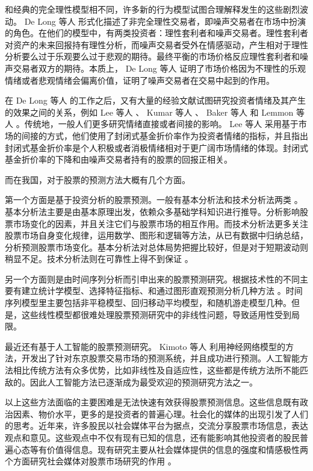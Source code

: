 和经典的完全理性模型相不同，许多新的行为模型试图合理解释发生的这些剧烈波动。 De Long 等人 \cite{intro:5} 形式化描述了非完全理性交易者，即噪声交易者在市场中扮演的角色。在他们的模型中，有两类投资者：理性套利者和噪声交易者。理性套利者对资产的未来回报持有理性分析，而噪声交易者受外在情感驱动，产生相对于理性分析要么过于乐观要么过于悲观的期待。最终平衡的市场价格反应理性套利者和噪声交易者双方的期待。本质上， De Long 等人 \cite{intro:5} 证明了市场价格因为不理性的乐观情绪或者悲观情绪会偏离价值，证明了噪声交易者在交易中起到的作用。

在 De Long 等人 \cite{intro:5} 的工作之后，又有大量的经验文献试图研究投资者情绪及其产生的效果之间的关系，例如 Lee 等人 \cite{intro:6} 、 Kumar 等人 \cite{intro:7} 、 Baker 等人 \cite{intro:8} 和 Lemmon 等人 \cite{intro:9} 。传统地，一般人们更多研究情绪直接或者间接的影响。 Lee 等人 \cite{intro:6} 采用基于市场的间接的方式，他们使用了封闭式基金折价率作为投资者情绪的指标，并且指出封闭式基金折价率是个人积极或者消极情绪相对于更广阔市场情绪的体现。封闭式基金折价率的下降和由噪声交易者持有的股票的回报正相关。

而在我国，对于股票的预测方法大概有几个方面。

第一个方面是基于投资分析的股票预测。一般有基本分析法和技术分析法两类 \cite{intro:10} 。基本分析法主要是由基本原理出发，依赖众多基础学科知识进行推导。分析影响股票市场变化的因素，并且关注它们与股票市场的相互作用。而技术分析法更多关注股票市场自身变化规律，运用数学、图形和逻辑等方法，从已有数据中归纳总结，分析预测股票市场变化。基本分析法对总体局势把握比较好，但是对于短期波动则稍显不足。技术分析法则在可靠性上得不到保证 \cite{intro:11} 。

另一个方面则是由时间序列分析而引申出来的股票预测研究。根据技术性的不同主要有建立统计学模型、选择特征指标、和通过图形直观预测分析几种方法 \cite{intro:12}\cite{intro:13} 。时间序列模型里主要包括非平稳模型、回归移动平均模型，和随机游走模型几种。但是，这些线性模型都很难处理股票预测研究中的非线性问题，导致适用性受到局限。

最近还有基于人工智能的股票预测研究。 Kimoto 等人 \cite{intro:14} 利用神经网络模型的方法，开发出了针对东京股票交易市场的预测系统，并且成功进行预测。人工智能方法相比传统方法有众多优势，比如非线性及自适应性，这些都是传统方法所不能匹敌的。因此人工智能方法已逐渐成为最受欢迎的预测研究方法之一。

以上这些方法面临的主要困难是无法快速有效获得股票预测信息。这些信息既有政治因素、物价水平，更多的是投资者的普遍心理。社会化的媒体的出现引发了人们的思考。近年来，许多股民以社会媒体平台为据点，交流分享股票市场信息，表达观点和意见。这些观点中不仅有现有已知的信息，还有能影响其他投资者的股民普遍心态等有价值得信息。现有研究主要从社会媒体提供的信息的强度和情感极性两个方面研究社会媒体对股票市场研究的作用 \cite{intro:15} 。

